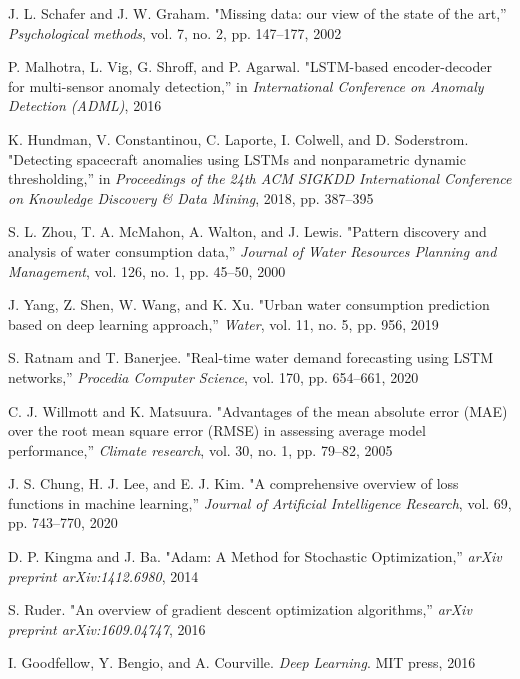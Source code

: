 \begin{thebibliography}{99}
J. L. Schafer and J. W. Graham. "Missing data: our view of the state of the art,'' \textit{Psychological methods}, vol. 7, no. 2, pp. 147--177, 2002

P. Malhotra, L. Vig, G. Shroff, and P. Agarwal. "LSTM-based encoder-decoder for multi-sensor anomaly detection,'' in \textit{International Conference on Anomaly Detection (ADML)}, 2016

K. Hundman, V. Constantinou, C. Laporte, I. Colwell, and D. Soderstrom. "Detecting spacecraft anomalies using LSTMs and nonparametric dynamic thresholding,'' in \textit{Proceedings of the 24th ACM SIGKDD International Conference on Knowledge Discovery \& Data Mining}, 2018, pp. 387--395

S. L. Zhou, T. A. McMahon, A. Walton, and J. Lewis. "Pattern discovery and analysis of water consumption data,'' \textit{Journal of Water Resources Planning and Management}, vol. 126, no. 1, pp. 45--50, 2000

J. Yang, Z. Shen, W. Wang, and K. Xu. "Urban water consumption prediction based on deep learning approach,'' \textit{Water}, vol. 11, no. 5, pp. 956, 2019

S. Ratnam and T. Banerjee. "Real-time water demand forecasting using LSTM networks,'' \textit{Procedia Computer Science}, vol. 170, pp. 654--661, 2020

C. J. Willmott and K. Matsuura. "Advantages of the mean absolute error (MAE) over the root mean square error (RMSE) in assessing average model performance,'' \textit{Climate research}, vol. 30, no. 1, pp. 79--82, 2005

J. S. Chung, H. J. Lee, and E. J. Kim. "A comprehensive overview of loss functions in machine learning,'' \textit{Journal of Artificial Intelligence Research}, vol. 69, pp. 743--770, 2020

D. P. Kingma and J. Ba. "Adam: A Method for Stochastic Optimization,'' \textit{arXiv preprint arXiv:1412.6980}, 2014

S. Ruder. "An overview of gradient descent optimization algorithms,'' \textit{arXiv preprint arXiv:1609.04747}, 2016

I. Goodfellow, Y. Bengio, and A. Courville. \textit{Deep Learning}. MIT press, 2016

\end{thebibliography}

% 
% 
% 
